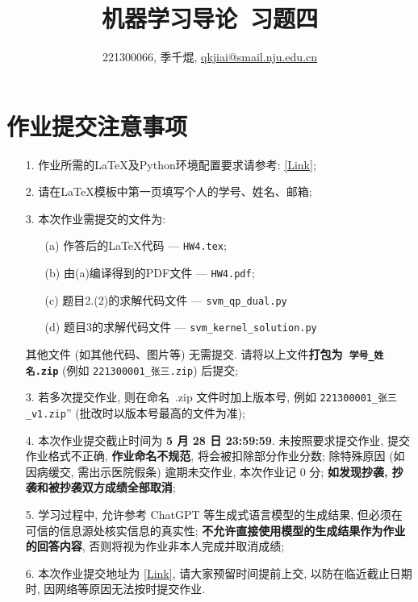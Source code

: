 \documentclass[a4paper,UTF8]{article}
\numberwithin{equation}{section}
\theoremstyle{definition}
\begin{document}
\title{机器学习导论\ 习题四}
\author{221300066, 季千焜, \href{mailto:邮箱}{qkjiai@smail.nju.edu.cn}}
\maketitle
\section*{作业提交注意事项}
\begin{tcolorbox}
    \begin{enumerate}
        \item[1.] 作业所需的LaTeX及Python环境配置要求请参考: \href{https://www.lamda.nju.edu.cn/ML2024Spring/supplemantary/environment.pdf}{[Link]};
        \item[2.] 请在LaTeX模板中第一页填写个人的学号、姓名、邮箱;
        \item[3.] 本次作业需提交的文件为:
        \begin{enumerate}
            \item [(a)] 作答后的LaTeX代码 --- \texttt{HW4.tex};
            \item [(b)] 由(a)编译得到的PDF文件 --- \texttt{HW4.pdf};
            \item [(c)] 题目2.(2)的求解代码文件 --- \texttt{svm\_qp\_dual.py}
            \item [(d)] 题目3的求解代码文件 --- \texttt{svm\_kernel\_solution.py}
        \end{enumerate}
        其他文件 (如其他代码、图片等) 无需提交. 请将以上文件{\color{red}\textbf{打包为~\texttt{学号\hspace{0em}\_\hspace{0em}姓名.zip}}} (例如 \texttt{221300001\hspace{0em}\_\hspace{0em}张三.zip}) 后提交;
        \item[3.] 若多次提交作业, 则在命名~.zip 文件时加上版本号, 例如 \texttt{221300001\_\hspace{0em}张三\hspace{0em}\_v1.zip}” (批改时以版本号最高的文件为准);
        \item[4.] 本次作业提交截止时间为 {\color{red}\textbf{ 5 月 28 日 23:59:59}}. 未按照要求提交作业, 提交作业格式不正确, {\color{red}\textbf{作业命名不规范}}, 将会被扣除部分作业分数; 除特殊原因 (如因病缓交, 需出示医院假条) 逾期未交作业, 本次作业记 0 分; {\color{red}\textbf{如发现抄袭, 抄袭和被抄袭双方成绩全部取消}};
        \item[5.] 学习过程中, 允许参考 ChatGPT 等生成式语言模型的生成结果, 但必须在可信的信息源处核实信息的真实性; {\color{red}\textbf{不允许直接使用模型的生成结果作为作业的回答内容}}, 否则将视为作业非本人完成并取消成绩;
        \item[6.] 本次作业提交地址为 \href{https://box.nju.edu.cn/u/d/9c31a6ce4970487183a9/}{[Link]}, 请大家预留时间提前上交, 以防在临近截止日期时, 因网络等原因无法按时提交作业.
    \end{enumerate}
\end{tcolorbox}
\newpage
\end{document}
